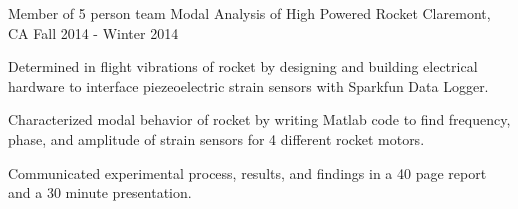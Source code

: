 \begin{cventries}
  \cventry
    {Member of 5 person team} %
    {Modal Analysis of High Powered Rocket} %
    {Claremont, CA} %
    {Fall 2014 - Winter 2014} %
    {
      \begin{cvitems} %
        \item {Determined in flight vibrations of rocket by designing and building electrical hardware to interface piezeoelectric strain sensors with Sparkfun Data Logger.}
        \item {Characterized modal behavior of rocket by writing Matlab code to find frequency, phase, and amplitude of strain sensors for 4 different rocket motors.}
        \item {Communicated experimental process, results, and findings in a 40 page report and a 30 minute presentation.}
      \end{cvitems}
    }

  \end{cventries}
